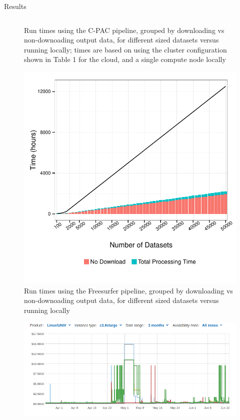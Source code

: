 \documentclass[final,hyperref={pdfpagelabels=false}]{beamer}
\begin{document}
\begin{frame}
\begin{columns}
\begin{column}{.5\textwidth}
{\begin{block}{Results}
\begin{column}{.47\textwidth}
\begin{figure}
                  \caption{\label{fig:cpac-times}Run times using the C-PAC pipeline, grouped by downloading vs non-downoading output data, for different sized datasets versus running locally; times are based on using the cluster configuration shown in Table 1 for the cloud, and a single compute node locally}
              \end{figure}
              \begin{figure}
                  \includegraphics[width=.99\textwidth]{fs-times.pdf}
                  \caption{\label{fig:fs-times}Run times using the Freesurfer pipeline, grouped by downloading vs non-downoading output data, for different sized datasets versus running locally}
              \end{figure}
              \begin{figure}
                  \includegraphics[width=.99\textwidth]{spot_history.png}

\end{figure}
\end{column}
\end{block}}
\end{column}
\end{columns}
\end{frame}
\end{document}

